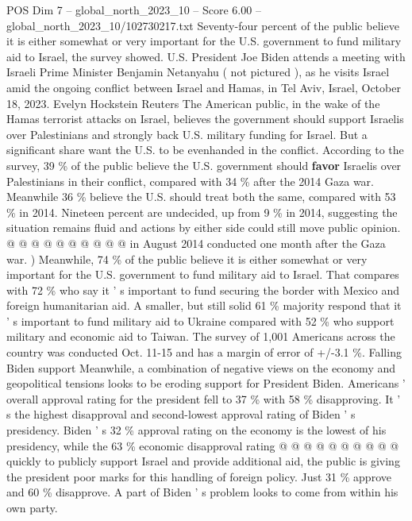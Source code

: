 \begin{textsample}{POS Dim 7 – global\_north\_2023\_10 – Score 6.00 – global\_north\_2023\_10/102730217.txt}  \label{ex:f7_pos_256}
Seventy-four percent of the public believe it is either somewhat or very important for the U.S. government to fund military aid to Israel, the survey showed.
U.S.
President Joe Biden attends a meeting with Israeli Prime Minister Benjamin Netanyahu ( not pictured ), as he visits Israel amid the ongoing conflict between Israel and Hamas, in Tel Aviv, Israel, October 18, 2023.
Evelyn Hockstein Reuters The American public, in the wake of the Hamas terrorist attacks on Israel, believes the government should support Israelis over Palestinians and strongly back U.S. military funding for Israel.
But a significant share want the U.S. to be evenhanded in the conflict.
According to the survey, 39 \% of the public believe the U.S. government should \textbf{favor} Israelis over Palestinians in their conflict, compared with 34 \% after the 2014 Gaza war.
Meanwhile 36 \% believe the U.S. should treat both the same, compared with 53 \% in 2014.
Nineteen percent are undecided, up from 9 \% in 2014, suggesting the situation remains fluid and actions by either side could still move public opinion. @ @ @ @ @ @ @ @ @ @ in August 2014 conducted one month after the Gaza war. ) Meanwhile, 74 \% of the public believe it is either somewhat or very important for the U.S. government to fund military aid to Israel.
That compares with 72 \% who say it ' s important to fund securing the border with Mexico and foreign humanitarian aid.
A smaller, but still solid 61 \% majority respond that it ' s important to fund military aid to Ukraine compared with 52 \% who support military and economic aid to Taiwan.
The survey of 1,001 Americans across the country was conducted Oct. 11-15 and has a margin of error of +/-3.1 \%.
Falling Biden support Meanwhile, a combination of negative views on the economy and geopolitical tensions looks to be eroding support for President Biden.
Americans ' overall approval rating for the president fell to 37 \% with 58 \% disapproving.
It ' s the highest disapproval and second-lowest approval rating of Biden ' s presidency.
Biden ' s 32 \% approval rating on the economy is the lowest of his presidency, while the 63 \% economic disapproval rating @ @ @ @ @ @ @ @ @ @ quickly to publicly support Israel and provide additional aid, the public is giving the president poor marks for this handling of foreign policy.
Just 31 \% approve and 60 \% disapprove.
A part of Biden ' s problem looks to come from within his own party.

\end{textsample}
